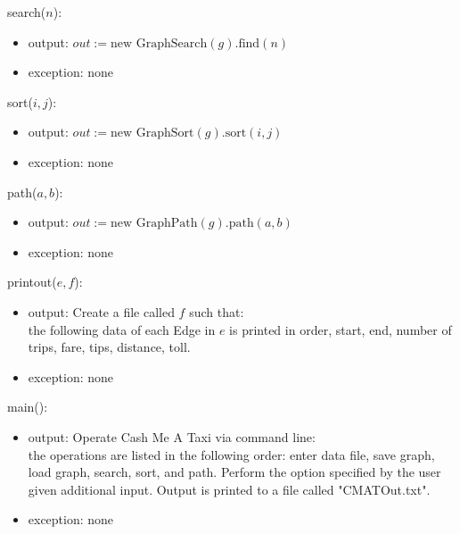 \documentclass[12pt]{article}
\begin{document}
\noindent search($n$):
\begin{itemize}
	\item output: $out := \mbox{new GraphSearch}(\textit{g}).\mbox{find}(n)$
	\item exception: none
\end{itemize}

\noindent sort($i, j$):
\begin{itemize}
	\item output: $out := \mbox{new GraphSort}(\textit{g}).\mbox{sort}(i, j)$
	\item exception: none
\end{itemize}

\noindent path($a, b$):
\begin{itemize}
	\item output: $out := \mbox{new GraphPath}(\textit{g}).\mbox{path}(a, b)$
	\item exception: none
\end{itemize}

\noindent printout($e, f$):
\begin{itemize}
	\item output: Create a file called $f$ such that: \\
	the following data of each Edge in $e$ is printed in order, start, end, number of trips, fare, tips, distance, toll.
	\item exception: none
\end{itemize}

\noindent main():
\begin{itemize}
	\item output: Operate Cash Me A Taxi via command line: \\
	the operations are listed in the following order: enter data file, save graph, load graph, search, sort, and path. Perform the option specified by the user given additional input. Output is printed to a file called "CMATOut.txt".
	\item exception: none
\end{itemize}
\end{document}

